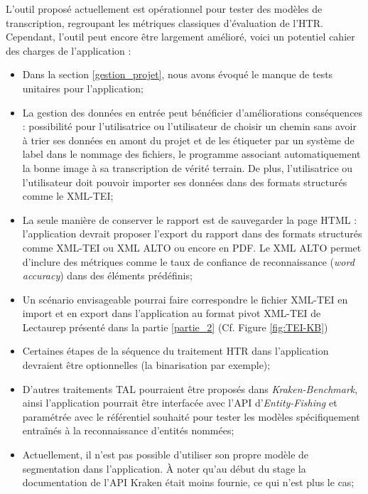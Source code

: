 L'outil proposé actuellement est opérationnel pour tester des modèles de transcription, regroupant les métriques classiques d'évaluation de l'HTR. Cependant, l'outil peut encore être largement amélioré, voici un potentiel cahier des charges de l'application :
\begin{itemize}
    \item Dans la section \ref{gestion_projet}, nous avons évoqué le manque de tests unitaires pour l'application;
    \item La gestion des données en entrée peut bénéficier d'améliorations conséquences : possibilité pour l'utilisatrice ou l'utilisateur de choisir un chemin sans avoir à trier ses données en amont du projet et de les étiqueter par un système de label dans le nommage des fichiers, le programme associant automatiquement la bonne image à sa transcription de vérité terrain. De plus, l'utilisatrice ou l'utilisateur doit pouvoir importer ses données dans des formats structurés comme le XML-TEI;
    \item La seule manière de conserver le rapport est de sauvegarder la page HTML : l'application devrait proposer l'export du rapport dans des formats structurés comme XML-TEI ou XML ALTO ou encore en PDF. Le XML ALTO permet d'inclure des métriques comme le taux de confiance de reconnaissance (\textit{word accuracy}) dans des éléments prédéfinis; 
    \item Un scénario envisageable pourrai faire correspondre le fichier XML-TEI en import et en export dans l'application au format pivot XML-TEI de Lectaurep présenté dans la partie \ref{partie_2} (Cf. Figure \ref{fig:TEI-KB})
    \item Certaines étapes de la séquence du traitement HTR dans l'application devraient être optionnelles (la binarisation par exemple);
    \item D'autres traitements TAL pourraient être proposés dans \textit{Kraken-Benchmark}, ainsi l'application pourrait être interfacée avec l'API d'\textit{Entity-Fishing} et paramétrée avec le référentiel souhaité pour tester les modèles spécifiquement entraînés à la reconnaissance d'entités nommées; 
    \item Actuellement, il n'est pas possible d'utiliser son propre modèle de segmentation dans l'application. À noter qu'au début du stage la documentation de l'API Kraken était moins fournie, ce qui n'est plus le cas;

\end{itemize}
